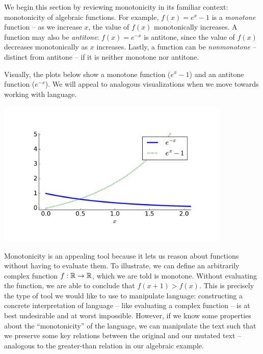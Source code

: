 
%
%
We begin this section by reviewing monotonicity in its familiar context:
  monotonicity of algebraic functions.
For example, $f(x) = e^x - 1$ is a \textit{monotone} function -- as we increase $x$,
  the value of $f(x)$ monotonically increases.
A function may also be \textit{antitone}: $f(x) = e^{-x}$ is antitone, since 
  the value of $f(x)$ decreases monotonically as $x$ increases.
Lastly, a function can be \textit{nonmonotone} -- distinct from antitone -- if
  it is neither monotone nor antitone.

Visually, the plots below show a monotone function ($e^x - 1$) and an antitone 
  function ($e^{-x}$).
We will appeal to analogous visualizations when we move towards working with
  language.

\begin{center}
\includegraphics[height=7cm]{img/monotonicity_math.pdf}
\end{center}


Monotonicity is an appealing tool because it lets us reason about functions
  without having to evaluate them.
To illustrate, we can define an arbitrarily complex function $f : \mathbb{R} \rightarrow \mathbb{R}$,
  which we are told is monotone.
Without evaluating the function, we are able to conclude that
  $f(x + 1) > f(x)$.
This is precisely the type of tool we would like to use to manipulate language:
  constructing a concrete interpretation of language -- like evaluating 
  a complex function -- is at best undesirable and at worst impossible.
However, if we know some properties about the ``monotonicity'' of the language,
  we can manipulate the text such that we preserve some key relations
  between the original and our mutated text -- analogous to the greater-than
  relation in our algebraic example.


